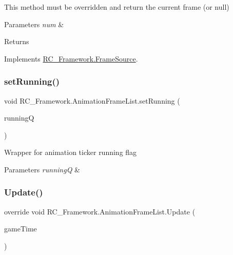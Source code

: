 This method must be overridden and return the current frame (or null) 


\begin{DoxyParams}{Parameters}
{\em num} & \\
\hline
\end{DoxyParams}
\begin{DoxyReturn}{Returns}

\end{DoxyReturn}


Implements \mbox{\hyperlink{class_r_c___framework_1_1_frame_source_a6fd84a8d608da7d9ff2ff5ab10ed4243}{R\+C\+\_\+\+Framework.\+Frame\+Source}}.

\mbox{\label{class_r_c___framework_1_1_animation_frame_list_af45c9ca8028ef05f2a23def6bf4f5f82}} 
\subsubsection{\texorpdfstring{set\+Running()}{setRunning()}}
{\footnotesize\ttfamily void R\+C\+\_\+\+Framework.\+Animation\+Frame\+List.\+set\+Running (\begin{DoxyParamCaption}\item[{bool}]{runningQ }\end{DoxyParamCaption})}



Wrapper for animation ticker running flag 


\begin{DoxyParams}{Parameters}
{\em runningQ} & \\
\hline
\end{DoxyParams}
\mbox{\label{class_r_c___framework_1_1_animation_frame_list_ad6d3b045da01a972a32f48ae7b7c7598}} 
\subsubsection{\texorpdfstring{Update()}{Update()}}
{\footnotesize\ttfamily override void R\+C\+\_\+\+Framework.\+Animation\+Frame\+List.\+Update (\begin{DoxyParamCaption}\item[{Game\+Time}]{game\+Time }\end{DoxyParamCaption})\hspace{0.3cm}{\ttfamily [virtual]}}



